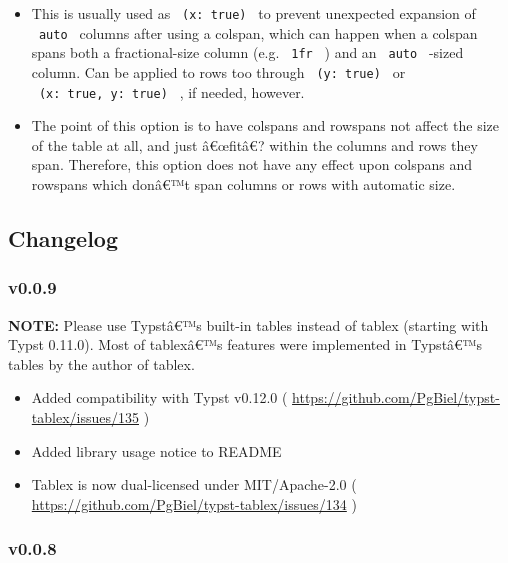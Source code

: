 \begin{enumerate}
\begin{itemize}
    \begin{itemize}
    \tightlist
    \item
      This is usually used as \texttt{\ (x:\ true)\ } to prevent
      unexpected expansion of \texttt{\ auto\ } columns after using a
      colspan, which can happen when a colspan spans both a
      fractional-size column (e.g. \texttt{\ 1fr\ } ) and an
      \texttt{\ auto\ } -sized column. Can be applied to rows too
      through \texttt{\ (y:\ true)\ } or
      \texttt{\ (x:\ true,\ y:\ true)\ } , if needed, however.
    \item
      The point of this option is to have colspans and rowspans not
      affect the size of the table at all, and just â€œfitâ€? within the
      columns and rows they span. Therefore, this option does not have
      any effect upon colspans and rowspans which donâ€™t span columns
      or rows with automatic size.
    \end{itemize}
  \end{itemize}
\end{enumerate}

\subsection{Changelog}\label{changelog}

\subsubsection{v0.0.9}\label{v0.0.9}

\textbf{NOTE:} Please use Typstâ€™s built-in tables instead of tablex
(starting with Typst 0.11.0). Most of tablexâ€™s features were
implemented in Typstâ€™s tables by the author of tablex.

\begin{itemize}
\tightlist
\item
  Added compatibility with Typst v0.12.0 (
  \url{https://github.com/PgBiel/typst-tablex/issues/135} )
\item
  Added library usage notice to README
\item
  Tablex is now dual-licensed under MIT/Apache-2.0 (
  \url{https://github.com/PgBiel/typst-tablex/issues/134} )
\end{itemize}

\subsubsection{v0.0.8}\label{v0.0.8}

